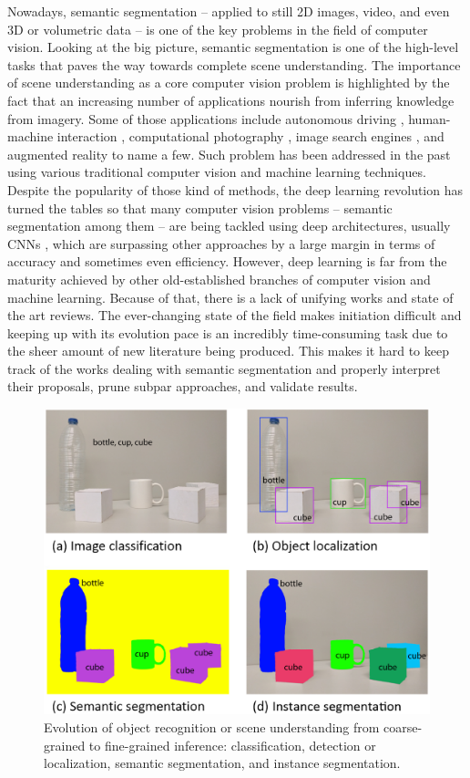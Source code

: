 Nowadays, semantic segmentation -- applied to still 2D images, video, and even 3D or volumetric data -- is one of the key problems in the field of computer vision. Looking at the big picture, semantic segmentation is one of the high-level tasks that paves the way towards complete scene understanding. The importance of scene understanding as a core computer vision problem is highlighted by the fact that an increasing number of applications nourish from inferring knowledge from imagery. Some of those applications include autonomous driving \cite{Ess2009}\cite{Geiger2012}\cite{Cordts2016}, human-machine interaction \cite{Oberweger2015}, computational photography \cite{Yoon2015}, image search engines \cite{Wan2014}, and augmented reality to name a few. Such problem has been addressed in the past using various traditional computer vision and machine learning techniques. Despite the popularity of those kind of methods, the deep learning revolution has turned the tables so that many computer vision problems -- semantic segmentation among them -- are being tackled using deep architectures, usually \acp{CNN} \cite{Ning2005}\cite{Ciresan2012}\cite{Farabet2013}\cite{Hariharan2014}\cite{Gupta2014}, which are surpassing other approaches by a large margin in terms of accuracy and sometimes even efficiency. However, deep learning is far from the maturity achieved by other old-established branches of computer vision and machine learning. Because of that, there is a lack of unifying works and state of the art reviews. The ever-changing state of the field makes initiation difficult and keeping up with its evolution pace is an incredibly time-consuming task due to the sheer amount of new literature being produced. This makes it hard to keep track of the works dealing with semantic segmentation and properly interpret their proposals, prune subpar approaches, and validate results.

\begin{figure}[!b]
	\centering
	\includegraphics[width=0.8\linewidth]{Figures/Segmentation/example_rework.eps}
	\caption{Evolution of object recognition or scene understanding from coarse-grained to fine-grained inference: classification, detection or localization, semantic segmentation, and instance segmentation.}
	\label{fig:background_evolution}
\end{figure}

